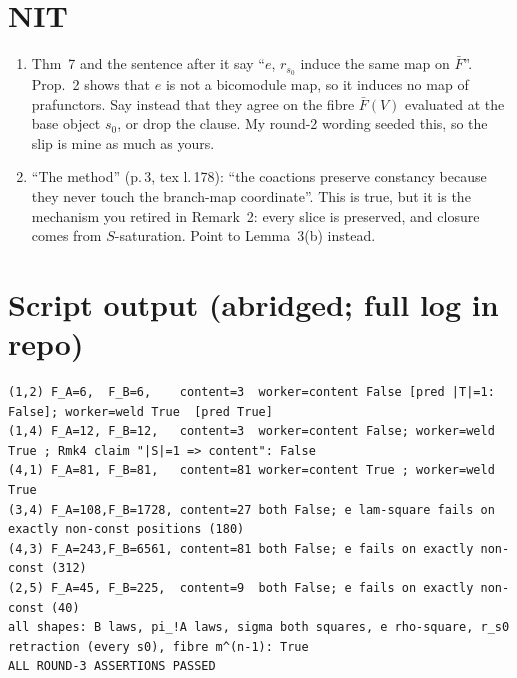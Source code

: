 \documentclass[10pt]{article}
\begin{document}
\section*{NIT}
\begin{enumerate}[label=\textbf{N\arabic*.},leftmargin=*]
\item Thm~7 and the sentence after it say ``$e$, $r_{s_0}$ induce the same map on $\bar F$''. Prop.~2 shows that $e$ is not a bicomodule map, so
  it induces no map of prafunctors. Say instead that they agree on the fibre $\bar F(V)$ evaluated at the base object $s_0$, or drop the clause. My round-2 wording
  seeded this, so the slip is mine as much as yours.
\item ``The method'' (p.\,3, tex l.\,178): ``the coactions preserve constancy because they never touch the branch-map coordinate''.
  This is true, but it is the mechanism you retired in Remark~2: every slice is preserved, and closure comes from $S$-saturation. Point to Lemma~3(b) instead.
\end{enumerate}

\section*{Script output (abridged; full log in repo)}
{\footnotesize\begin{verbatim}
(1,2) F_A=6,  F_B=6,    content=3  worker=content False [pred |T|=1: False]; worker=weld True  [pred True]
(1,4) F_A=12, F_B=12,   content=3  worker=content False; worker=weld True ; Rmk4 claim "|S|=1 => content": False
(4,1) F_A=81, F_B=81,   content=81 worker=content True ; worker=weld True
(3,4) F_A=108,F_B=1728, content=27 both False; e lam-square fails on exactly non-const positions (180)
(4,3) F_A=243,F_B=6561, content=81 both False; e fails on exactly non-const (312)
(2,5) F_A=45, F_B=225,  content=9  both False; e fails on exactly non-const (40)
all shapes: B laws, pi_!A laws, sigma both squares, e rho-square, r_s0 retraction (every s0), fibre m^(n-1): True
ALL ROUND-3 ASSERTIONS PASSED
\end{verbatim}}
\end{document}
